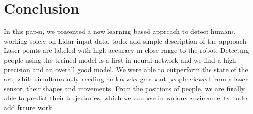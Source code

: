 \section{Conclusion}

\label{sec:Conclusion}

In this paper, we presented a new learning based approach to detect humans, working solely on Lidar input data. todo: add simple description of the approach
Laser points are labeled with high accuracy in close range to the robot. Detecting people using the trained model is a first in neural network and we find a high precision and an overall good model. We were able to outperform the state of the art, while simultaneously needing no knowledge about people viewed from a laser sensor, their shapes and movements. From the positions of people, we are finally able to predict their trajectories, which we can use in various environments.
todo: add future work
